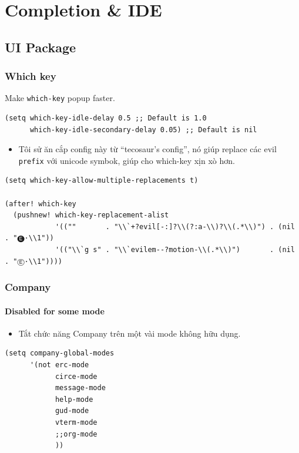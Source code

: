 \documentclass[11pt]{article}
\begin{document}
\section{Completion \& IDE}
\label{sec:orgefff4ee}
\subsection{UI Package}
\label{sec:orgf61c19a}
\subsubsection{Which key}
\label{sec:org22f454c}
Make \texttt{which-key} popup faster.

\begin{verbatim}
(setq which-key-idle-delay 0.5 ;; Default is 1.0
      which-key-idle-secondary-delay 0.05) ;; Default is nil
\end{verbatim}

\begin{itemize}
\item Tôi sử ăn cắp config này từ ``tecosaur's config'', nó giúp replace các evil
\texttt{prefix} với unicode symbok, giúp cho which-key xịn xò hơn.
\end{itemize}

\begin{verbatim}
(setq which-key-allow-multiple-replacements t)

(after! which-key
  (pushnew! which-key-replacement-alist
            '((""       . "\\`+?evil[-:]?\\(?:a-\\)?\\(.*\\)") . (nil . "🅔·\\1"))
            '(("\\`g s" . "\\`evilem--?motion-\\(.*\\)")       . (nil . "Ⓔ·\\1"))))
\end{verbatim}

\subsubsection{Company}
\label{sec:org764fbc3}
\paragraph{Disabled for some mode}
\label{sec:orgd82e87d}
\begin{itemize}
\item Tắt chức năng Company trên một vài mode không hữu dụng.
\end{itemize}
\begin{verbatim}
(setq company-global-modes
      '(not erc-mode
            circe-mode
            message-mode
            help-mode
            gud-mode
            vterm-mode
            ;;org-mode
            ))
\end{verbatim}
\end{document}
